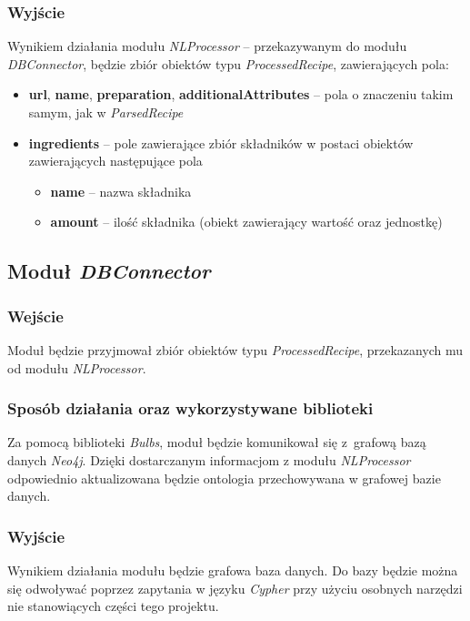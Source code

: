 \documentclass[11pt,a4paper]{article}
\begin{document}
\subsubsection{Wyjście}
Wynikiem działania modułu \textit{NLProcessor} -- przekazywanym do modułu \textit{DBConnector}, będzie zbiór obiektów typu \textit{ProcessedRecipe}, zawierających pola:
\begin{itemize}
  \item \textbf{url}, \textbf{name}, \textbf{preparation}, \textbf{additionalAttributes} -- pola o znaczeniu takim samym, jak w \textit{ParsedRecipe}
  \item \textbf{ingredients} -- pole zawierające zbiór składników w postaci obiektów zawierających następujące pola
  \begin{itemize}
  \item \textbf{name} -- nazwa składnika
  \item \textbf{amount} -- ilość składnika (obiekt zawierający wartość oraz jednostkę)
\end{itemize}
\end{itemize}


\subsection{Moduł \textit{DBConnector}}
\subsubsection{Wejście}
Moduł będzie przyjmował zbiór obiektów typu \textit{ProcessedRecipe}, przekazanych mu od modułu \textit{NLProcessor}.
\subsubsection{Sposób działania oraz wykorzystywane biblioteki}
Za pomocą biblioteki \textit{Bulbs}, moduł będzie komunikował się z~grafową bazą danych \textit{Neo4j}. Dzięki dostarczanym informacjom z modułu \textit{NLProcessor } odpowiednio aktualizowana będzie ontologia przechowywana w grafowej bazie danych. 
\subsubsection{Wyjście}
Wynikiem działania modułu będzie grafowa baza danych. Do bazy będzie można się odwoływać poprzez zapytania w języku \textit{Cypher} przy użyciu osobnych narzędzi nie stanowiących części tego projektu.


%
\end{document}
